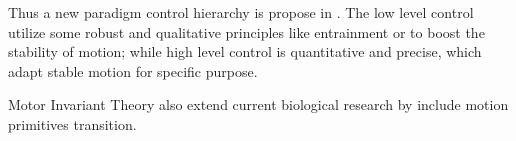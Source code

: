 Thus a new paradigm control hierarchy is propose in \moit.
The low level control utilize some robust and qualitative principles like entrainment or \cpg to boost the stability of motion;
while high level control is quantitative and  precise, which adapt stable motion for specific purpose.


Motor Invariant Theory also extend current biological research by include motion primitives transition.


 

 



